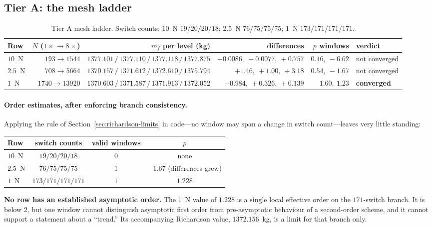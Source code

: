 \documentclass[11pt]{article}
\newcommand{\mf}{m_f}
\begin{document}
\subsection{Tier A: the mesh ladder}

\begin{table}[h]
\centering
\small
\begin{tabular}{lrrrrl}
\toprule
Row & $N$ ($1\times\!\to\!8\times$) & $\mf$ per level (kg) & differences & $p$ windows & verdict \\
\midrule
$10$~N  & $193\to1544$   & $1377.101\,/\,1377.110\,/\,1377.118\,/\,1377.875$
        & $+0.0086,\ +0.0077,\ +0.757$ & $0.16,\ -6.62$ & not converged \\
$2.5$~N & $708\to5664$   & $1370.157\,/\,1371.612\,/\,1372.610\,/\,1375.794$
        & $+1.46,\ +1.00,\ +3.18$      & $0.54,\ -1.67$ & not converged \\
$1$~N   & $1740\to13920$ & $1370.603\,/\,1371.587\,/\,1371.913\,/\,1372.052$
        & $+0.984,\ +0.326,\ +0.139$   & $1.60,\ 1.23$  & \textbf{converged} \\
\bottomrule
\end{tabular}
\caption{Tier A mesh ladder. Switch counts: $10$~N $19/20/20/18$;
$2.5$~N $76/75/75/75$; $1$~N $173/171/171/171$.}
\end{table}

\paragraph{Order estimates, after enforcing branch consistency.} Applying the
rule of Section~\ref{sec:richardson-limits} in code---no window may span a
change in switch count---leaves very little standing:

\begin{center}
\small
\begin{tabular}{lccc}
\toprule
Row & switch counts & valid windows & $p$ \\
\midrule
$10$~N  & $19/20/20/18$    & $0$ & none \\
$2.5$~N & $76/75/75/75$    & $1$ & $-1.67$ (differences grew) \\
$1$~N   & $173/171/171/171$& $1$ & $1.228$ \\
\bottomrule
\end{tabular}
\end{center}

\textbf{No row has an established asymptotic order.} The $1$~N value of
$1.228$ is a single local effective order on the $171$-switch branch. It is
below $2$, but one window cannot distinguish asymptotic first order from
pre-asymptotic behaviour of a second-order scheme, and it cannot support a
statement about a ``trend.'' Its accompanying Richardson value, $1372.156$~kg,
is a limit for that branch only.
\end{document}
